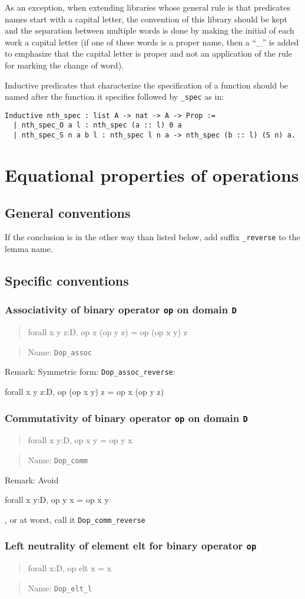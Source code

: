 \documentclass[a4paper]{article}
\newcommand\itemrule[3]{
\subsubsection{#1}
\begin{quote}
\begin{tt}
#3
\end{tt}
\end{quote}
\begin{quote}
Name: \texttt{#2}
\end{quote}}
\newcommand\formula[1]{\begin{tt}#1\end{tt}}
\newcommand\name[1]{\texttt{#1}}
\newcommand\op{\texttt{op}}
\newcommand\D{\texttt{D}}
\begin{document}
As an exception, when extending libraries whose general rule is that
predicates names start with a capital letter, the convention of this
library should be kept and the separation between multiple words is
done by making the initial of each work a capital letter (if one of
these words is a proper name, then a ``{\_}'' is added to emphasize
that the capital letter is proper and not an application of the rule
for marking the change of word).

Inductive predicates that characterize the specification of a function
should be named after the function it specifies followed by
\texttt{\_spec} as in:

\begin{verbatim}
Inductive nth_spec : list A -> nat -> A -> Prop :=
  | nth_spec_O a l : nth_spec (a :: l) 0 a
  | nth_spec_S n a b l : nth_spec l n a -> nth_spec (b :: l) (S n) a.
\end{verbatim}

\section{Equational properties of operations}

\subsection{General conventions}

If the conclusion is in the other way than listed below, add suffix
\name{\_reverse} to the lemma name.

\subsection{Specific conventions}

\itemrule{Associativity of binary operator {\op} on domain {\D}}{Dop\_assoc}
{forall x y z:D, op x (op y z) = op (op x y) z}

  Remark: Symmetric form: \name{Dop\_assoc\_reverse}:
  \formula{forall x y z:D, op (op x y) z = op x (op y z)}

\itemrule{Commutativity of binary operator {\op} on domain {\D}}{Dop\_comm}
{forall x y:D, op x y = op y x}

  Remark: Avoid \formula{forall x y:D, op y x = op x y}, or at worst, call it
  \name{Dop\_comm\_reverse}

\itemrule{Left neutrality of element elt for binary operator {\op}}{Dop\_elt\_l}
{forall x:D, op elt x = x}
\end{document}
